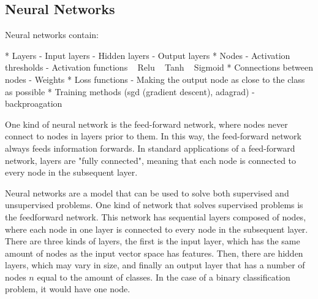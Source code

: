 


\subsection{Neural Networks}\label{bg:nn}



Neural networks contain:

* Layers
	- Input layers
	- Hidden layers
	- Output layers
* Nodes
	- Activation thresholds
	- Activation functions %
		~ Relu
		~ Tanh
		~ Sigmoid
* Connections between nodes
	- Weights
* Loss functions
	- Making the output node as close to the class as possible
* Training methods (sgd (gradient descent), adagrad)
	- backproagation
	
	

One kind of neural network is the feed-forward network, where nodes never connect to nodes in layers prior to them. In this way, the feed-forward network always feeds information forwards. In standard applications of a feed-forward network, layers are "fully connected", meaning that each node is connected to every node in the subsequent layer. 

Neural networks are a model that can be used to solve both supervised and unsupervised problems. One kind of network that solves supervised problems is the feedforward network. This network has sequential layers composed of nodes, where each node in one layer is connected to every node in the subsequent layer. There are three kinds of layers, the first is the input layer, which has the same amount of nodes as the input vector space has features. Then, there are hidden layers, which may vary in size, and finally an output layer that has a number of nodes $n$ equal to the amount of classes. In the case of a binary classification problem, it would have one node.

